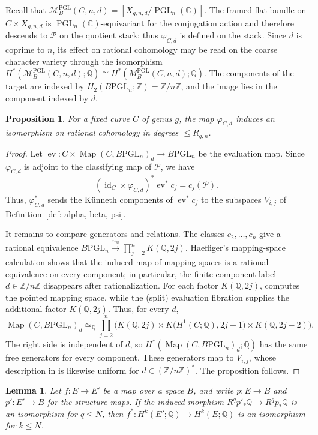 \documentclass[11pt,reqno]{amsart}
\theoremstyle{plain} %
\newtheorem{prop}[theorem]{Proposition}
\newtheorem{lemma}[theorem]{Lemma}
\theoremstyle{definition}
\newcommand{\QQ}{\mathbb{Q}}
\newcommand{\CC}{\mathbb{C}}
\newcommand{\M}{\mathcal{M}}
\newcommand{\mc}{\mathcal}
\newcommand{\ZZ}{\mathbb{Z}}
\DeclareMathOperator{\PGL}{PGL}
\newcommand{\BPGL}{B\mathrm{PGL}}
\DeclareMathOperator{\Map}{Map}
\DeclareMathOperator{\ev}{ev}
\DeclareMathOperator{\id}{id}
\begin{document}
Recall that $\M_B^{\PGL}(C,n,d)=[X_{g,n,d}/\PGL_n(\CC)]$. The framed flat bundle on $C \times X_{g,n,d}$ is $\PGL_n(\CC)$-equivariant for the conjugation action and therefore descends to $\mc P$ on the quotient stack; thus $\varphi_{C,d}$ is defined on the stack. Since $d$ is coprime to $n$, its effect on rational cohomology may be read on the coarse character variety through the isomorphism $H^*(\M_B^{\PGL}(C,n,d);\QQ) \cong H^*(M_B^{\PGL}(C,n,d);\QQ)$. The components of the target are indexed by $H_2(\BPGL_n;\ZZ)=\ZZ/n\ZZ$, and the image lies in the component indexed by $d$.

\begin{prop} \label{prop: fiber comparison}
For a fixed curve $C$ of genus $g$, the map $\varphi_{C,d}$ induces an isomorphism on rational cohomology in degrees $\le R_{g,n}$.
\end{prop}

\begin{proof}
Let $\ev \colon C \times \Map(C,\BPGL_n)_d \to \BPGL_n$ be the evaluation map. Since $\varphi_{C,d}$ is adjoint to the classifying map of $\mc P$, we have
\[
(\id_C \times \varphi_{C,d})^*\ev^*c_j=c_j(\mc P).
\]
Thus, $\varphi_{C,d}^*$ sends the K\"unneth components of $\ev^*c_j$ to the subspaces $V_{i,j}$ of Definition~\ref{def: alpha, beta, psi}.

It remains to compare generators and relations. The classes $c_2,\dots,c_n$ give a rational equivalence $\BPGL_n \xrightarrow{\sim_\QQ} \prod_{j=2}^n K(\QQ,2j)$. Haefliger's mapping-space calculation \cite{Haefliger} shows that the induced map of mapping spaces is a rational equivalence on every component; in particular, the finite component label $d\in\ZZ/n\ZZ$ disappears after rationalization. For each factor $K(\QQ,2j)$, \cite[Lemma~3.5.3]{BDPW} computes the pointed mapping space, while the (split) evaluation fibration supplies the additional factor $K(\QQ,2j)$. Thus, for every $d$,
\[
\Map(C,\BPGL_n)_d \simeq_{\QQ} \prod_{j=2}^n \Big(K(\QQ,2j) \times K\big(H^1(C;\QQ),2j-1\big) \times K(\QQ,2j-2)\Big).
\]
The right side is independent of $d$, so $H^*(\Map(C,\BPGL_n)_d;\QQ)$ has the same free generators for every component. These generators map to $V_{i,j}$, whose description in  is likewise uniform for $d\in(\ZZ/n\ZZ)^*$. The proposition follows.
\end{proof}


\begin{lemma} \label{lem: range comparison}
Let $f \colon E \to E'$ be a map over a space $B$, and write $p \colon E \to B$ and $p' \colon E' \to B$ for the structure maps. If the induced morphism $R^q p'_*\QQ \to R^q p_*\QQ$ 
is an isomorphism for $q \le N$, then $f^* \colon H^k(E';\QQ) \to H^k(E;\QQ)$ 
is an isomorphism for $k \le N$.
\end{lemma}
\end{document}
